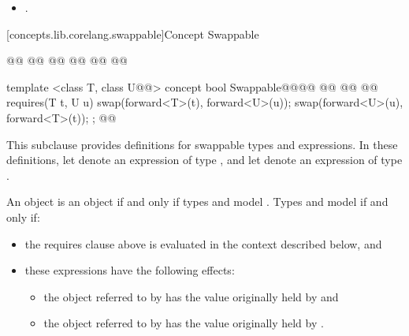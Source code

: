 \begin{addedblock}
{\begin{itemdescr}
\begin{itemize}
\item {}.
\end{itemize}
\end{itemdescr}
}

[concepts.lib.corelang.swappable]{Concept Swappable}

%
\begin{itemdecl}
@@
@@
  @@
    @@
  @\newtxt{\};}@
@\newtxt{\}}@

template <class T, class U@@>
concept bool Swappable@\newtxt{() \{}@@\oldtxt{ =}@
  @@
    @@
    @@
    requires(T t, U u) {
      swap(forward<T>(t), forward<U>(u));
      swap(forward<U>(u), forward<T>(t));
    };
@\newtxt{\}}@
\end{itemdecl}

\begin{itemdescr}

\pnum
This subclause provides definitions for swappable types and expressions. In these
definitions, let  denote an expression of type , and let 
denote an expression of type .

\pnum
An object  is  an object  if and only if
types  and  model . Types  and 
model  if and only if:

\begin{itemize}
\item the requires clause above is evaluated in the context described below, and

\item these expressions have the following effects:

\begin{itemize}
\item the object referred to by  has the value originally held by  and
\item the object referred to by  has the value originally held by .
\end{itemize}
\end{itemize}


\end{itemdescr}
\end{addedblock}
